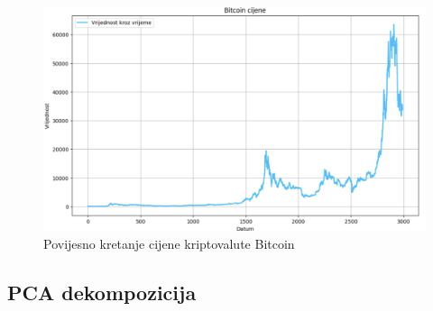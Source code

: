 \documentclass[zavrsnirad]{fer}
\begin{document}
\begin{figure}[H]
    \centering
    \includegraphics[width=1.0\textwidth]{Figures/BTC_hist.png}
    \caption{Povijesno kretanje cijene kriptovalute Bitcoin}
    \label{fig:BTC_hist}
\end{figure}


\subsection{PCA dekompozicija}
\label{sek:pca_rezultati}
\end{document}
